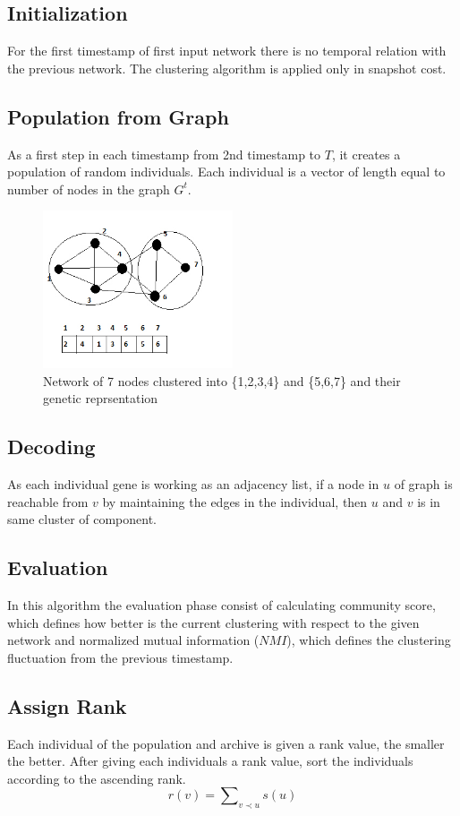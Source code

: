 \documentclass[12pt]{arsubmit}
\begin{document}
\subsection {Initialization}
For the first timestamp of first input network there is no temporal relation with the previous network. The clustering algorithm is applied only in snapshot cost.
\subsection {Population from Graph}
As a first step in each timestamp from 2nd timestamp to $T$, it creates a population of random individuals. Each individual is a vector of length equal to number of nodes in the graph $G^t$. 
\begin{figure}
\centering
\includegraphics[width=0.5\textwidth]{graph}
\caption {Network of 7 nodes clustered into \{1,2,3,4\} and \{5,6,7\} and their genetic reprsentation}
\label {fig:graph}
\end{figure}
\subsection {Decoding}
As each individual gene is working as an adjacency list, if a node in $u$ of graph is reachable from $v$ by maintaining the edges in the individual, then $u$ and $v$ is in same cluster of component.
\subsection {Evaluation}
In this algorithm the evaluation phase consist of calculating community score, which defines how better is the current clustering with respect to the given network and normalized mutual information ($NMI$), which defines the clustering fluctuation from the previous timestamp. 
\subsection {Assign Rank}
Each individual of the population and archive is given a rank value, the smaller the better. After giving each individuals a rank value, sort the individuals according to the ascending rank. 
\begin {equation}
r(v) = \sum\nolimits_{v\prec u} s(u)
\label {eq:rank}
\end {equation}
\end{document}
